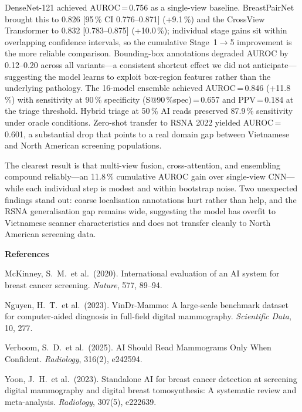 \documentclass[10pt,letterpaper]{article}
\begin{document}
DenseNet-121 achieved AUROC\,=\,0.756 as a single-view baseline.
BreastPairNet brought this to 0.826 [95\,\% CI 0.776--0.871] (+9.1\,\%) and
the CrossView Transformer to 0.832 [0.783--0.875] (+10.0\,\%); individual
stage gains sit within overlapping confidence intervals, so the cumulative
Stage~1$\to$5 improvement is the more reliable comparison. Bounding-box
annotations degraded AUROC by 0.12--0.20 across all variants---a consistent
shortcut effect we did not anticipate---suggesting the model learns to
exploit box-region features rather than the underlying pathology. The 16-model
ensemble achieved AUROC\,=\,0.846 (+11.8\,\%) with sensitivity at 90\,\%
specificity (S@90\,\%spec)\,=\,0.657 and PPV\,=\,0.184 at the triage
threshold. Hybrid triage at 50\,\% AI reads preserved 87.9\,\% sensitivity
under oracle conditions. Zero-shot transfer to RSNA 2022 yielded
AUROC\,=\,0.601, a substantial drop that points to a real domain gap between
Vietnamese and North American screening populations.

The clearest result is that multi-view fusion, cross-attention, and ensembling
compound reliably---an 11.8\,\% cumulative AUROC gain over single-view
CNN---while each individual step is modest and within bootstrap noise. Two
unexpected findings stand out: coarse localisation annotations hurt rather than
help, and the RSNA generalisation gap remains wide, suggesting the model has
overfit to Vietnamese scanner characteristics and does not transfer cleanly to
North American screening data.

\vspace{6pt}
\noindent\textbf{References}

\vspace{2pt}
\noindent McKinney, S.\ M.\ et al.\ (2020). International evaluation of an AI
system for breast cancer screening. \textit{Nature}, 577, 89--94.

\noindent Nguyen, H.\ T.\ et al.\ (2023). VinDr-Mammo: A large-scale benchmark
dataset for computer-aided diagnosis in full-field digital mammography.
\textit{Scientific Data}, 10, 277.

\noindent Verboom, S.\ D.\ et al.\ (2025). AI Should Read Mammograms Only When
Confident. \textit{Radiology}, 316(2), e242594.

\noindent Yoon, J.\ H.\ et al.\ (2023). Standalone AI for breast cancer
detection at screening digital mammography and digital breast tomosynthesis:
A systematic review and meta-analysis. \textit{Radiology}, 307(5), e222639.
\end{document}
